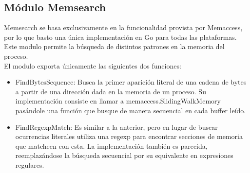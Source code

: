 \subsection{Módulo Memsearch}

Memsearch se basa exclusivamente en la funcionalidad provista por Memaccess,
por lo que basto una única implementación en Go para todas las plataformas.
Este modulo permite la búsqueda de distintos patrones en la memoria del
proceso.\\

El modulo exporta únicamente las siguientes dos funciones:

\begin{itemize}

\item FindBytesSequence: Busca la primer aparición literal de una cadena de
bytes a partir de una dirección dada en la memoria de un proceso. Su
implementación consiste en llamar a memaccess.SlidingWalkMemory pasándole una
función que busque de manera secuencial en cada buffer leído.\\

\item FindRegexpMatch: Es similar a la anterior, pero en lugar de buscar
ocurrencias literales utiliza una regexp para encontrar secciones de memoria
que matcheen con esta. La implementación también es parecida, reemplazándose la
búsqueda secuencial por su equivalente en expresiones regulares.\\

\end{itemize}

